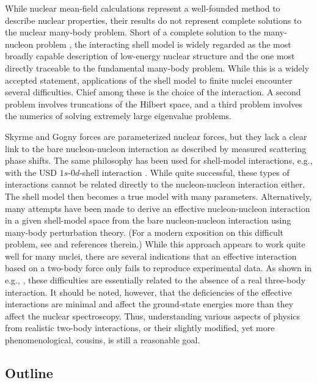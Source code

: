 \documentclass[rmp,preprint,aps,floatfix]{revtex4}
\begin{document}
While nuclear mean-field calculations represent a well-founded 
method to describe nuclear properties, their results do not
represent complete solutions to the nuclear many-body problem. 
Short of a complete solution to the many-nucleon problem \cite{Vijay}, the
interacting shell model is widely regarded as the most broadly capable
description of low-energy nuclear structure and the one most 
directly traceable to the fundamental many-body problem. While
this is a widely accepted statement, applications of the shell model 
to finite nuclei encounter several difficulties. Chief among these
is the choice of the interaction. A second problem involves 
truncations of the Hilbert space, and a third problem involves 
the numerics of solving extremely large eigenvalue problems. 

Skyrme and Gogny forces are parameterized nuclear forces, but they
lack a clear link to the bare nucleon-nucleon interaction as
described by measured scattering phase shifts.  The same philosophy 
has been used for shell-model interactions, e.g., with the
USD $1s$-$0d$-shell interaction \cite{wilden}. While quite
successful, these types of interactions cannot be related 
directly to the nucleon-nucleon interaction either. The shell model
then becomes a true model with many parameters. Alternatively, 
many attempts have been made to derive an effective nucleon-nucleon
interaction in a given shell-model space from the bare nucleon-nucleon
interaction using many-body perturbation theory. (For a modern exposition
on this difficult problem, see \cite{mhj_95} and references therein.)
While this approach appears to work quite well for many nuclei, there 
are several indications \cite{Vijay,vijay2,vijay3} that an effective 
interaction based on a two-body force only fails to reproduce experimental
data. As shown in e.g., \cite{Vijay,vijay2,vijay3}, these
difficulties are essentially related to the absence of a real
three-body interaction. It should
be noted, however, that the deficiencies of the effective
interactions are minimal and affect the ground-state energies more
than they affect the nuclear spectroscopy. Thus, understanding 
various aspects of physics from realistic two-body interactions, or their 
slightly modified, yet more phenomenological, cousins,
is still a reasonable goal. 


\subsection{Outline}
\end{document}
